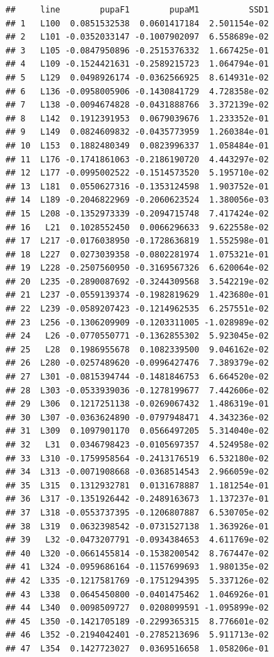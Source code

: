 \documentclass[
]{article}
\begin{document}
\begin{verbatim}
##     line        pupaF1        pupaM1          SSD1
## 1   L100  0.0851532538  0.0601417184  2.501154e-02
## 2   L101 -0.0352033147 -0.1007902097  6.558689e-02
## 3   L105 -0.0847950896 -0.2515376332  1.667425e-01
## 4   L109 -0.1524421631 -0.2589215723  1.064794e-01
## 5   L129  0.0498926174 -0.0362566925  8.614931e-02
## 6   L136 -0.0958005906 -0.1430841729  4.728358e-02
## 7   L138 -0.0094674828 -0.0431888766  3.372139e-02
## 8   L142  0.1912391953  0.0679039676  1.233352e-01
## 9   L149  0.0824609832 -0.0435773959  1.260384e-01
## 10  L153  0.1882480349  0.0823996337  1.058484e-01
## 11  L176 -0.1741861063 -0.2186190720  4.443297e-02
## 12  L177 -0.0995002522 -0.1514573520  5.195710e-02
## 13  L181  0.0550627316 -0.1353124598  1.903752e-01
## 14  L189 -0.2046822969 -0.2060623524  1.380056e-03
## 15  L208 -0.1352973339 -0.2094715748  7.417424e-02
## 16   L21  0.1028552450  0.0066296633  9.622558e-02
## 17  L217 -0.0176038950 -0.1728636819  1.552598e-01
## 18  L227  0.0273039358 -0.0802281974  1.075321e-01
## 19  L228 -0.2507560950 -0.3169567326  6.620064e-02
## 20  L235 -0.2890087692 -0.3244309568  3.542219e-02
## 21  L237 -0.0559139374 -0.1982819629  1.423680e-01
## 22  L239 -0.0589207423 -0.1214962535  6.257551e-02
## 23  L256 -0.1306209909 -0.1203311005 -1.028989e-02
## 24   L26 -0.0770550771 -0.1362855302  5.923045e-02
## 25   L28  0.1986955678  0.1082339500  9.046162e-02
## 26  L280 -0.0257489620 -0.0996427476  7.389379e-02
## 27  L301 -0.0815394744 -0.1481846753  6.664520e-02
## 28  L303 -0.0533939036 -0.1278199677  7.442606e-02
## 29  L306  0.1217251138 -0.0269067432  1.486319e-01
## 30  L307 -0.0363624890 -0.0797948471  4.343236e-02
## 31  L309  0.1097901170  0.0566497205  5.314040e-02
## 32   L31  0.0346798423 -0.0105697357  4.524958e-02
## 33  L310 -0.1759958564 -0.2413176519  6.532180e-02
## 34  L313 -0.0071908668 -0.0368514543  2.966059e-02
## 35  L315  0.1312932781  0.0131678887  1.181254e-01
## 36  L317 -0.1351926442 -0.2489163673  1.137237e-01
## 37  L318 -0.0553737395 -0.1206807887  6.530705e-02
## 38  L319  0.0632398542 -0.0731527138  1.363926e-01
## 39   L32 -0.0473207791 -0.0934384653  4.611769e-02
## 40  L320 -0.0661455814 -0.1538200542  8.767447e-02
## 41  L324 -0.0959686164 -0.1157699693  1.980135e-02
## 42  L335 -0.1217581769 -0.1751294395  5.337126e-02
## 43  L338  0.0645450800 -0.0401475462  1.046926e-01
## 44  L340  0.0098509727  0.0208099591 -1.095899e-02
## 45  L350 -0.1421705189 -0.2299365315  8.776601e-02
## 46  L352 -0.2194042401 -0.2785213696  5.911713e-02
## 47  L354  0.1427723027  0.0369516658  1.058206e-01

\end{verbatim}
\end{document}
